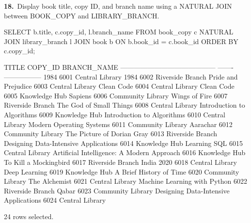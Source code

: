 \noindent\begin{minipage}{\linewidth}
\begingroup{}
{\fontsize{14}{17}\selectfont\textbf{18.}}\ Display book title, copy ID, and branch name using a NATURAL JOIN between BOOK\_COPY and LIBRARY\_BRANCH.\par
\endgroup\vspace{12pt}


\begin{sqlcode}
SELECT b.title, c.copy_id, l.branch_name
FROM book_copy c
NATURAL JOIN library_branch l
JOIN book b ON b.book_id = c.book_id
ORDER BY c.copy_id;
\end{sqlcode}

\vspace{18pt}


\begin{sqlout}[fontsize=\small]
TITLE                                       COPY_ID  BRANCH_NAME      
------------------------------------------  -------  -----------------
1984                                           6001  Central Library
1984                                           6002  Riverside Branch
Pride and Prejudice                            6003  Central Library
Clean Code                                     6004  Central Library
Clean Code                                     6005  Knowledge Hub
Sapiens                                        6006  Community Library
Wings of Fire                                  6007  Riverside Branch
The God of Small Things                        6008  Central Library
Introduction to Algorithms                     6009  Knowledge Hub
Introduction to Algorithms                     6010  Central Library
Modern Operating Systems                       6011  Community Library
Aarachar                                       6012  Community Library
The Picture of Dorian Gray                     6013  Riverside Branch
Designing Data-Intensive Applications          6014  Knowledge Hub
Learning SQL                                   6015  Central Library
Artificial Intelligence: A Modern Approach     6016  Knowledge Hub
To Kill a Mockingbird                          6017  Riverside Branch
India 2020                                     6018  Central Library
Deep Learning                                  6019  Knowledge Hub
A Brief History of Time                        6020  Community Library
The Alchemist                                  6021  Central Library
Machine Learning with Python                   6022  Riverside Branch
Qabar                                          6023  Community Library
Designing Data-Intensive Applications          6024  Central Library

24 rows selected.
\end{sqlout}
\end{minipage}\par\vspace{24pt}

